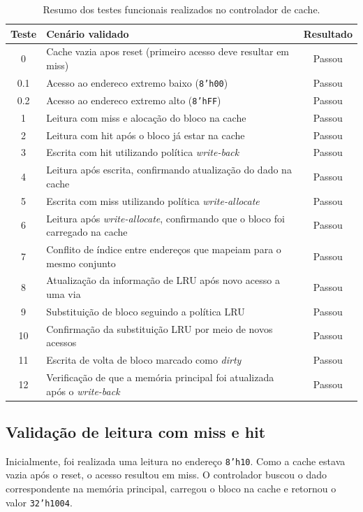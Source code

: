 ﻿\documentclass[12pt,a4paper]{article}
\begin{document}
\begin{table}[h]
\centering
\begin{tabular}{|c|p{7cm}|c|}
\hline
\textbf{Teste} & \textbf{Cenário validado} & \textbf{Resultado} \\
\hline
0 & Cache vazia apos reset (primeiro acesso deve resultar em miss) & Passou \\
\hline
0.1 & Acesso ao endereco extremo baixo (\texttt{8'h00}) & Passou \\
\hline
0.2 & Acesso ao endereco extremo alto (\texttt{8'hFF}) & Passou \\
\hline
1 & Leitura com miss e alocação do bloco na cache & Passou \\
\hline
2 & Leitura com hit após o bloco já estar na cache & Passou \\
\hline
3 & Escrita com hit utilizando política \textit{write-back} & Passou \\
\hline
4 & Leitura após escrita, confirmando atualização do dado na cache & Passou \\
\hline
5 & Escrita com miss utilizando política \textit{write-allocate} & Passou \\
\hline
6 & Leitura após \textit{write-allocate}, confirmando que o bloco foi carregado na cache & Passou \\
\hline
7 & Conflito de índice entre endereços que mapeiam para o mesmo conjunto & Passou \\
\hline
8 & Atualização da informação de LRU após novo acesso a uma via & Passou \\
\hline
9 & Substituição de bloco seguindo a política LRU & Passou \\
\hline
10 & Confirmação da substituição LRU por meio de novos acessos & Passou \\
\hline
11 & Escrita de volta de bloco marcado como \textit{dirty} & Passou \\
\hline
12 & Verificação de que a memória principal foi atualizada após o \textit{write-back} & Passou \\
\hline
\end{tabular}
\caption{Resumo dos testes funcionais realizados no controlador de cache.}
\label{tab:testes-cache}
\end{table}

\subsection{Validação de leitura com miss e hit}

Inicialmente, foi realizada uma leitura no endereço \texttt{8'h10}. Como a cache estava vazia após o reset, o acesso resultou em miss. O controlador buscou o dado correspondente na memória principal, carregou o bloco na cache e retornou o valor \texttt{32'h1004}.
\end{document}
